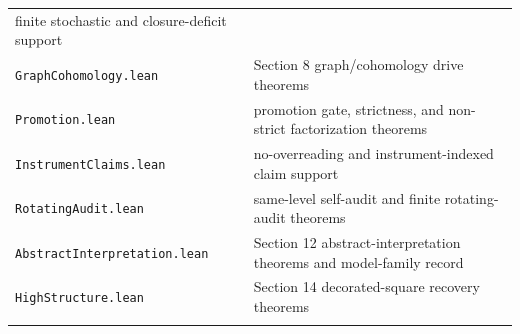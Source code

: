 \documentclass[11pt]{article}
\theoremstyle{definition}
\begin{document}
\begin{longtable}[]{@{}ll@{}}
\begin{minipage}[t]{0.47\columnwidth}
finite stochastic and closure-deficit support\strut
\end{minipage}\tabularnewline
\begin{minipage}[t]{0.47\columnwidth}\raggedright
\texttt{GraphCohomology.lean}\strut
\end{minipage} & \begin{minipage}[t]{0.47\columnwidth}\raggedright
Section 8 graph/cohomology drive theorems\strut
\end{minipage}\tabularnewline
\begin{minipage}[t]{0.47\columnwidth}\raggedright
\texttt{Promotion.lean}\strut
\end{minipage} & \begin{minipage}[t]{0.47\columnwidth}\raggedright
promotion gate, strictness, and non-strict factorization theorems\strut
\end{minipage}\tabularnewline
\begin{minipage}[t]{0.47\columnwidth}\raggedright
\texttt{InstrumentClaims.lean}\strut
\end{minipage} & \begin{minipage}[t]{0.47\columnwidth}\raggedright
no-overreading and instrument-indexed claim support\strut
\end{minipage}\tabularnewline
\begin{minipage}[t]{0.47\columnwidth}\raggedright
\texttt{RotatingAudit.lean}\strut
\end{minipage} & \begin{minipage}[t]{0.47\columnwidth}\raggedright
same-level self-audit and finite rotating-audit theorems\strut
\end{minipage}\tabularnewline
\begin{minipage}[t]{0.47\columnwidth}\raggedright
\texttt{AbstractInterpretation.lean}\strut
\end{minipage} & \begin{minipage}[t]{0.47\columnwidth}\raggedright
Section 12 abstract-interpretation theorems and model-family record\strut
\end{minipage}\tabularnewline
\begin{minipage}[t]{0.47\columnwidth}\raggedright
\texttt{HighStructure.lean}\strut
\end{minipage} & \begin{minipage}[t]{0.47\columnwidth}\raggedright
Section 14 decorated-square recovery theorems\strut
\end{minipage}\tabularnewline
\begin{minipage}[t]{0.47\columnwidth}\raggedright

\end{minipage}
\end{longtable}
\end{document}
